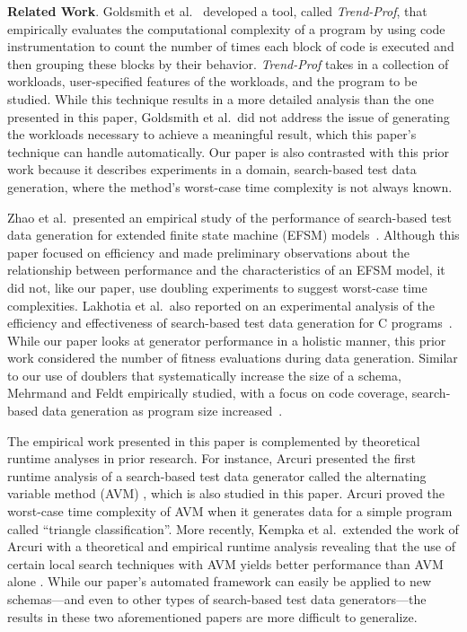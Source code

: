 {\bf Related Work}. Goldsmith et al.~\cite{Goldsmith2007} developed a tool, called \textit{Trend-Prof}, that empirically
evaluates the computational complexity of a program by using code instrumentation to count the number of times each
block of code is executed and then grouping these blocks by their behavior.  \textit{Trend-Prof} takes in a collection
of workloads, user-specified features of the workloads, and the program to be studied. While this technique results in a
more detailed analysis than the one presented in this paper, Goldsmith et al.\ did not address the issue of generating
the workloads necessary to achieve a meaningful result, which this paper's technique can handle automatically.  Our
paper is also contrasted with this prior work because it describes experiments in a domain, search-based test data
generation, where the method's worst-case time complexity is not always known.

Zhao et al.\ presented an empirical study of the performance of search-based test data generation for extended finite
state machine (EFSM) models~\cite{zhao2010}. Although this paper focused on efficiency and made preliminary observations
about the relationship between performance and the characteristics of an EFSM model, it did not, like our paper, use
doubling experiments to suggest worst-case time complexities.  Lakhotia et al.\ also reported on an experimental
analysis of the efficiency and effectiveness of search-based test data generation for C programs~\cite{lakhotia2013}.
While our paper looks at generator performance in a holistic manner, this prior work considered the number of fitness
evaluations during data generation. Similar to our use of doublers that systematically increase the size of a
schema, Mehrmand and Feldt empirically studied, with a focus on code coverage, search-based data generation as program size
increased~\cite{mehrmand2010}.



The empirical work presented in this paper is complemented by theoretical runtime analyses in prior research.  For
instance, Arcuri presented the first runtime analysis of a search-based test data generator called the alternating
variable method (AVM) \cite{arcuri2009}, which is also studied in this paper. Arcuri proved the worst-case time
complexity of AVM when it generates data for a simple program called ``triangle classification''. More recently, Kempka
et al.\ extended the work of Arcuri with a theoretical and empirical runtime analysis revealing that the use of certain
local search techniques with AVM yields better performance than AVM alone \cite{kempka2015}.  While our paper's
automated framework can easily be applied to new schemas---and even to other types of search-based test data
generators---the results in these two aforementioned papers are more difficult to generalize.


